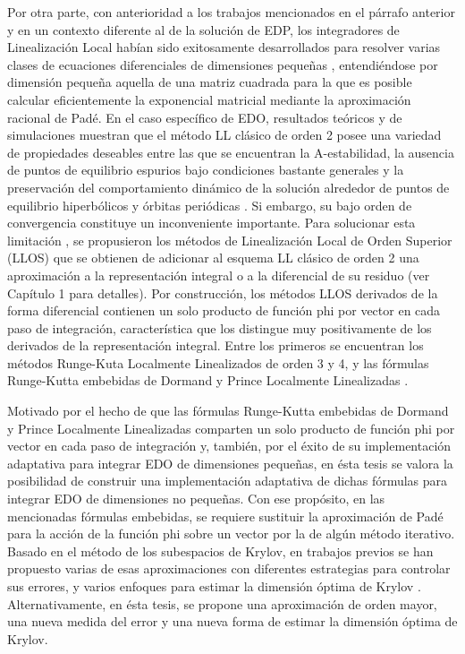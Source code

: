 Por otra parte, con anterioridad a los trabajos mencionados en el párrafo anterior y en un contexto diferente al de la solución de EDP, los integradores de Linealización Local habían sido exitosamente desarrollados para resolver varias clases de ecuaciones diferenciales de dimensiones pequeñas \cite{jimenez2020}, entendiéndose por dimensión pequeña aquella de una matriz cuadrada para la que es posible calcular eficientemente la exponencial matricial mediante la aproximación racional de Padé. En el caso específico de EDO, resultados teóricos y de simulaciones muestran que el método LL clásico de orden 2  \cite{pope1963exponential} posee una variedad de propiedades deseables entre las que se encuentran la A-estabilidad, la ausencia de puntos de equilibrio espurios bajo condiciones bastante generales y la preservación del comportamiento dinámico de la solución alrededor de puntos de equilibrio hiperbólicos y órbitas periódicas \cite{Jimenez02AMC}. Si embargo, su bajo orden de convergencia constituye un inconveniente importante. Para solucionar esta limitación \cite{delaCruz06,delaCruz07,Jimenez13}, se propusieron los métodos de Linealización Local de Orden Superior (LLOS) que se obtienen de adicionar al esquema LL clásico de orden 2 una aproximación a la representación integral o a la diferencial de su residuo (ver Capítulo 1 para detalles). Por construcción, los métodos LLOS derivados de la forma diferencial contienen un solo  producto de función phi por vector en cada paso de integración, característica que los distingue muy positivamente de los derivados de la representación integral. Entre los primeros se encuentran los métodos Runge-Kuta Localmente Linealizados de orden 3 y 4, y las fórmulas Runge-Kutta embebidas de Dormand y Prince Localmente Linealizadas \cite{delaCruz06,Jimenez13,Jimenez14AMC}.

Motivado por el hecho de que las fórmulas Runge-Kutta embebidas de Dormand y Prince Localmente Linealizadas comparten un solo producto de función phi por vector en cada paso de integración y, también, por el éxito de su implementación adaptativa para integrar EDO de dimensiones pequeñas, en ésta tesis se valora la posibilidad de construir una implementación adaptativa de dichas fórmulas para integrar EDO de dimensiones no pequeñas. Con ese propósito, en las mencionadas fórmulas embebidas, se requiere sustituir la aproximación de Padé para la acción de la función phi sobre un vector por la de algún método iterativo. Basado en el método de los subespacios de Krylov, en trabajos previos se han propuesto varias de esas aproximaciones con diferentes estrategias para controlar sus errores, y varios enfoques para estimar la dimensión óptima de Krylov \cite{hochbruck1998exponential,sidje1998expokit,niesen2012algorithm,gaudreault2018kiops}. Alternativamente, en ésta tesis, se propone una aproximación de orden mayor, una nueva medida del error y una nueva forma de estimar la dimensión óptima de Krylov.

